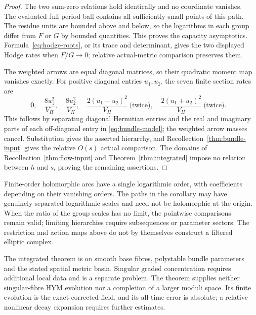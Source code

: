 \begin{proof}
The two sum-zero relations hold identically and no
coordinate vanishes. The evaluated full period ball
contains all sufficiently small points of this path.
The residue units are bounded above and below, so
the logarithms in each group differ from $F$ or $G$
by bounded quantities. This proves the capacity
asymptotics. Formula~\eqref{eq:hodge-roots}, or its
trace and determinant, gives the two displayed
Hodge rates when $F/G\to0$; relative actual-metric
comparison preserves them.

The weighted arrows are equal diagonal matrices,
so their quadratic moment map vanishes exactly.
For positive diagonal entries $u_1,u_2$, the seven
finite section rates are
\[
 0,\quad \frac{8u_1^2}{V_H},\quad\frac{8u_2^2}{V_H},
 \quad\frac{2(u_1-u_2)^2}{V_H}\ \text{(twice)},\quad
 \frac{2(u_1+u_2)^2}{V_H}\ \text{(twice)}.
\]
This follows by separating diagonal Hermitian entries
and the real and imaginary parts of each off-diagonal
entry in \eqref{eq:bundle-model}; the weighted arrow
masses cancel. Substitution gives the asserted
hierarchy, and Recollection~\ref{thm:bundle-input} gives
the relative $O(s)$ actual comparison.
The domains of Recollection~\ref{thm:flow-input} and
Theorem~\ref{thm:integrated} impose no relation between
$h$ and $s$, proving the remaining assertions.
\end{proof}

Finite-order holomorphic arcs have a single logarithmic
order, with coefficients depending on their vanishing
orders. The paths in the corollary may have genuinely
separated logarithmic scales and need not be holomorphic
at the origin. When the ratio of the group scales has
no limit, the pointwise comparisons remain valid;
limiting hierarchies require subsequences or parameter
sectors. The restriction and action maps above do not
by themselves construct a filtered elliptic complex.

The integrated theorem is on smooth base fibres,
polystable bundle parameters and the stated spatial
metric basin. Singular graded concentration requires
additional local data and is a separate problem.
The theorem supplies neither singular-fibre HYM
evolution nor a completion of a larger moduli space.
Its finite evolution is the exact corrected field,
and its all-time error is absolute; a relative
nonlinear decay expansion requires further estimates.
